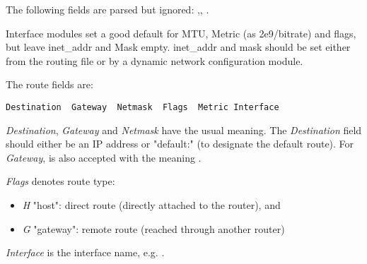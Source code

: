 The following fields are parsed but ignored: ,,
.

Interface modules set a good default for MTU, Metric (as 2e9/bitrate) and
flags, but leave inet\_addr and Mask empty. inet\_addr and mask should
be set either from the routing file or by a dynamic network configuration
module.

The route fields are:

\begin{verbatim}
Destination  Gateway  Netmask  Flags  Metric Interface
\end{verbatim}

\textit{Destination}, \textit{Gateway} and \textit{Netmask} have the usual meaning.
The \textit{Destination} field should either be an IP address or "default:"
(to designate the default route). For \textit{Gateway}, \ttt{*} is also
accepted with the meaning .

\textit{Flags} denotes route type:

\begin{itemize}
  \item \textit{H} "host": direct route (directly attached to the router), and
  \item \textit{G} "gateway": remote route (reached through another router)
\end{itemize}

\textit{Interface} is the interface name, e.g. .





